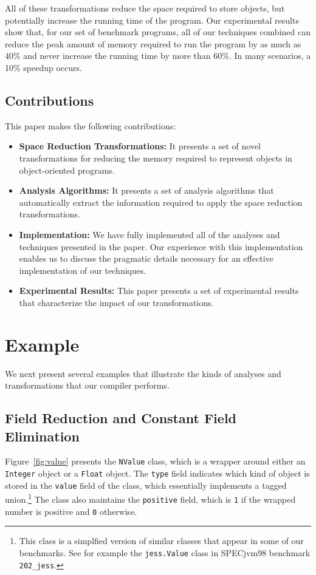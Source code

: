 \documentclass[oribibl]{llncs}
\begin{document}
All of these transformations reduce the space required to store
objects, but potentially increase the running time of the program.
Our experimental results show that, for our set of benchmark
programs, all of our techniques combined can reduce the peak amount of memory
required to run the program by as much as 40\% and never increase the
running time by more than 60\%.  In many scenarios, a 10\% speedup occurs.

\subsection{Contributions}

This paper makes the following contributions:
\begin{itemize}
\item {\bf Space Reduction Transformations:} It presents a set
of novel transformations for reducing the memory required to 
represent objects in object-oriented programs.

\item {\bf Analysis Algorithms:} It presents a set of 
analysis algorithms that automatically extract the 
information required to apply the space reduction 
transformations.

\item {\bf Implementation:} We have fully 
implemented all of the analyses and techniques 
presented in the paper. Our experience with this
implementation enables us to discuss the pragmatic
details necessary for an effective implementation 
of our techniques. 

\item {\bf Experimental Results:} This paper presents a set
of experimental results that characterize the impact
of our transformations.
\end{itemize}
%
\section{Example}
%
We next present several examples that illustrate the kinds of 
analyses and transformations that our compiler performs.
%
\subsection{Field Reduction and Constant Field Elimination}
%
Figure~\ref{fig:value} presents the {\tt NValue} class, which is 
a wrapper around either an {\tt Integer} object or a {\tt Float}
object. The {\tt type} field indicates which kind of object
is stored in the {\tt value} field of the class, 
which essentially implements a tagged 
union.\footnote{This class is a simplfied version of similar
classes that appear in some of our benchmarks.
See for example the {\tt jess.Value} class in SPECjvm98 benchmark
{\tt 202\_jess}.} 
The class also maintains the {\tt positive} field, which is
{\tt 1} if the wrapped number is positive and {\tt 0} otherwise. 
\end{document}
